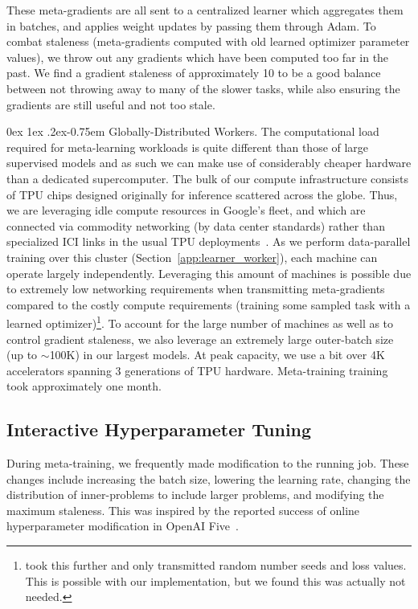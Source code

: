 \documentclass[11pt]{article}
\makeatletter
\renewcommand{\paragraph}{%
  \@startsection{paragraph}{4}%
  {\z@}{0ex \@plus 1ex \@minus .2ex}{-0.75em}%
  {\normalfont\normalsize\bfseries}%
}
\makeatother
\begin{document}
These meta-gradients are all sent to a centralized learner which aggregates them in batches, and applies weight updates by passing them through Adam.
To combat staleness (meta-gradients computed with old learned optimizer parameter values), we throw out any gradients which have been computed too far in the past.
We find a gradient staleness of approximately 10 to be a good balance between not throwing away to many of the slower tasks, while also ensuring the gradients are still useful and not too stale.


\paragraph{Globally-Distributed Workers.}
The computational load required for meta-learning workloads is quite different than those of large supervised models and as such we can make use of considerably cheaper hardware than a dedicated supercomputer.
The bulk of our compute infrastructure consists of TPU chips designed originally for inference scattered across the globe.
Thus, we are leveraging idle compute resources in Google's fleet, and which are connected via commodity networking (by data center standards) rather than specialized ICI links in the usual TPU deployments~\citep{jouppi2020domain}.
As we perform data-parallel training over this cluster (Section~\ref{app:learner_worker}), each machine can operate largely independently.
Leveraging this amount of machines is possible due to extremely low networking requirements when transmitting meta-gradients compared to the costly compute requirements (training some sampled task with a learned optimizer)\footnote{\citet{salimans2017evolution} took this further and only transmitted random number seeds and loss values. This is possible with our implementation, but we found this was actually not needed.}.
To account for the large number of machines as well as to control gradient staleness, we also leverage an extremely large outer-batch size (up to $\sim$100K) in our largest models.
At peak capacity, we use a bit over 4K accelerators spanning 3 generations of TPU hardware.
Meta-training training took approximately one month.







\subsection{Interactive Hyperparameter Tuning} \label{app:interactive_hparams}
During meta-training, we frequently made modification to the running job.
These changes include increasing the batch size, lowering the learning rate, changing the distribution of inner-problems to include larger problems, and modifying the maximum staleness.
This was inspired by the reported success of online hyperparameter modification in OpenAI Five~\citep{berner2019dota}.
\end{document}
